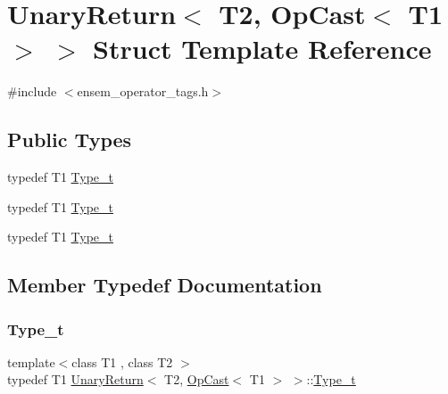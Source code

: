 \hypertarget{structUnaryReturn_3_01T2_00_01OpCast_3_01T1_01_4_01_4}{}\section{Unary\+Return$<$ T2, Op\+Cast$<$ T1 $>$ $>$ Struct Template Reference}
\label{structUnaryReturn_3_01T2_00_01OpCast_3_01T1_01_4_01_4}


{\ttfamily \#include $<$ensem\+\_\+operator\+\_\+tags.\+h$>$}

\subsection*{Public Types}
\begin{DoxyCompactItemize}
\item 
typedef T1 \mbox{\hyperlink{structUnaryReturn_3_01T2_00_01OpCast_3_01T1_01_4_01_4_a2783d52a76cad88255fd0cdbca603ebc}{Type\+\_\+t}}
\item 
typedef T1 \mbox{\hyperlink{structUnaryReturn_3_01T2_00_01OpCast_3_01T1_01_4_01_4_a2783d52a76cad88255fd0cdbca603ebc}{Type\+\_\+t}}
\item 
typedef T1 \mbox{\hyperlink{structUnaryReturn_3_01T2_00_01OpCast_3_01T1_01_4_01_4_a2783d52a76cad88255fd0cdbca603ebc}{Type\+\_\+t}}
\end{DoxyCompactItemize}


\subsection{Member Typedef Documentation}
\mbox{\label{structUnaryReturn_3_01T2_00_01OpCast_3_01T1_01_4_01_4_a2783d52a76cad88255fd0cdbca603ebc}} 
\subsubsection{\texorpdfstring{Type\_t}{Type\_t}\hspace{0.1cm}{\footnotesize\ttfamily [1/3]}}
{\footnotesize\ttfamily template$<$class T1 , class T2 $>$ \\
typedef T1 \mbox{\hyperlink{structUnaryReturn}{Unary\+Return}}$<$ T2, \mbox{\hyperlink{structOpCast}{Op\+Cast}}$<$ T1 $>$ $>$\+::\mbox{\hyperlink{structUnaryReturn_3_01T2_00_01OpCast_3_01T1_01_4_01_4_a2783d52a76cad88255fd0cdbca603ebc}{Type\+\_\+t}}}

